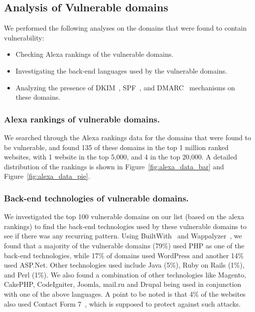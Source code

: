 \subsection{Analysis of Vulnerable domains}
\vspace{-1.5ex}
We performed the following analyses on the domains that were found to contain \ehi vulnerability:
\begin{itemize}
	\item Checking Alexa rankings of the vulnerable domains.
	\item Investigating the back-end languages used by the vulnerable domains.
	\item Analyzing the presence of DKIM~\cite{allman2007domainkeys}, SPF~\cite{schlitt2006sender}, and DMARC~\cite{kucherawy2015domain} mechanisms on these domains.
\end{itemize}

\vspace{-1.5ex}
\subsubsection{Alexa rankings of vulnerable domains.}
We searched through the Alexa rankings data\cite{alexa} for the domains that were found to be vulnerable, and found 135 of these domains in the top 1 million ranked websites, with 1 website in the top 5,000, and 4 in the top 20,000. A detailed distribution of the rankings is shown in Figure~\ref{fig:alexa_data_bar} and Figure~\ref{fig:alexa_data_pie}.


\vspace{-1.5ex}

\subsubsection{Back-end technologies of vulnerable domains.}
We investigated the top 100 vulnerable domains on our list (based on the alexa rankings) to find the back-end technologies used by these vulnerable domains to see if there was any recurring pattern. Using BuiltWith~\cite{builtwith} and Wappalyzer~\cite{wappalyzer}, we found that a majority of the vulnerable domains (79\%) used PHP as one of the back-end technologies, while 17\% of domains used WordPress and another 14\% used ASP.Net. Other technologies used include Java (5\%), Ruby on Rails (1\%), and Perl (1\%). We also found a combination of other technologies like Magento, CakePHP, CodeIgniter, Joomla, mail.ru and Drupal being used in conjunction with one of the above languages. A point to be noted is that 4\% of the websites also used Contact Form 7~\cite{CF7}, which is supposed to protect against such attacks.

